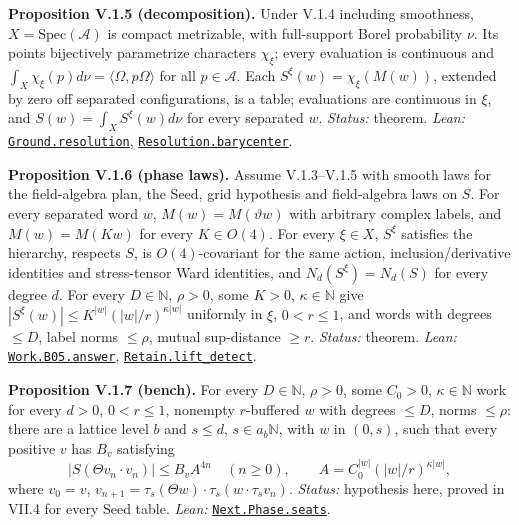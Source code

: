 \documentclass[
  letterpaper,
  11pt]{article}
\newcounter{none} %
\begin{document}
\textbf{Proposition V.1.5 (decomposition).} Under V.1.4 including
smoothness, \(X=\mathrm{Spec}(\mathcal A)\) is compact metrizable, with
full-support Borel probability \(\nu\). Its points bijectively
parametrize characters \(\chi_\xi\); every evaluation is continuous and
\(\int_X\chi_\xi(p)d\nu=\langle\Omega,p\Omega\rangle\) for all
\(p\in\mathcal A\). Each \(S^\xi(w)=\chi_\xi(M(w))\), extended by zero
off separated configurations, is a table; evaluations are continuous in
\(\xi\), and \(S(w)=\int_XS^\xi(w)d\nu\) for every separated \(w\).
\emph{Status:} theorem. \emph{Lean:}
\href{https://github.com/yang-mills-group/OpenAI-YM-20261028/blob/3456e5e75cf8d4cd558955a5c7638fba2d68f464/YM/Ground/Spectrum.lean\#L126-L140}{\texttt{Ground.resolution}},
\href{https://github.com/yang-mills-group/OpenAI-YM-20261028/blob/3456e5e75cf8d4cd558955a5c7638fba2d68f464/YM/Phase/Mixture.lean\#L113-L117}{\texttt{Resolution.barycenter}}.

\textbf{Proposition V.1.6 (phase laws).} Assume V.1.3--V.1.5 with smooth
laws for the field-algebra plan, the Seed, grid hypothesis and
field-algebra laws on \(S\). For every separated word \(w\),
\(M(w)=M(\vartheta w)\) with arbitrary complex labels, and
\(M(w)=M(Kw)\) for every \(K\in O(4)\). For every \(\xi\in X\),
\(S^\xi\) satisfies the hierarchy, respects \(S\), is \(O(4)\)-covariant
for the same action, inclusion/derivative identities and stress-tensor
Ward identities, and \(N_d(S^\xi)=N_d(S)\) for every degree \(d\). For
every \(D\in\mathbb N\), \(\rho>0\), some \(K>0\),
\(\kappa\in\mathbb N\) give \(|S^\xi(w)|\le K^{|w|}(|w|/r)^{\kappa|w|}\)
uniformly in \(\xi\), \(0<r\le1\), and words with degrees \(\le D\),
label norms \(\le\rho\), mutual sup-distance \(\ge r\). \emph{Status:}
theorem. \emph{Lean:}
\href{https://github.com/yang-mills-group/OpenAI-YM-20261028/blob/3456e5e75cf8d4cd558955a5c7638fba2d68f464/YM/Work/B05.lean\#L90-L115}{\texttt{Work.B05.answer}},
\href{https://github.com/yang-mills-group/OpenAI-YM-20261028/blob/3456e5e75cf8d4cd558955a5c7638fba2d68f464/YM/Phase/Picks.lean\#L128-L158}{\texttt{Retain.lift\_detect}}.

\textbf{Proposition V.1.7 (bench).} For every \(D\in\mathbb N\),
\(\rho>0\), some \(C_0>0\), \(\kappa\in\mathbb N\) work for every
\(d>0\), \(0<r\le1\), nonempty \(r\)-buffered \(w\) with degrees
\(\le D\), norms \(\le\rho\): there are a lattice level \(b\) and
\(s\le d\), \(s\in a_b\mathbb N\), with \(w\) in \((0,s)\), such that
every positive \(v\) has \(B_v\) satisfying
\[|S(\Theta v_n\cdot v_n)|\le B_vA^{4n}\quad(n\ge0),\qquad A=C_0^{|w|}(|w|/r)^{\kappa|w|},\]
where \(v_0=v\),
\(v_{n+1}=\tau_s(\Theta w)\cdot\tau_s(w\cdot\tau_sv_n)\). \emph{Status:}
hypothesis here, proved in VII.4 for every Seed table. \emph{Lean:}
\href{https://github.com/yang-mills-group/OpenAI-YM-20261028/blob/3456e5e75cf8d4cd558955a5c7638fba2d68f464/YM/Next/PHASE/Seats.lean\#L154-L160}{\texttt{Next.Phase.seats}}.
\end{document}
